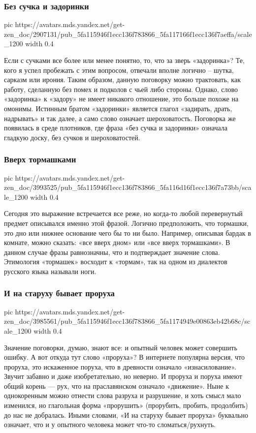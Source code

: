 \subsubsection{Без сучка и задоринки}

\ifcmt
  pic https://avatars.mds.yandex.net/get-zen_doc/2907131/pub_5fa115946f1ecc136f783866_5fa117166f1ecc136f7aeffa/scale_1200
  width 0.4
\fi

Если с сучками все более или менее понятно, то, что за зверь «задоринка»? Те,
кого я успел пробежать с этим вопросом, отвечали вполне логично – шутка,
сарказм или ирония. Таким образом, данную поговорку можно трактовать, как
работу, сделанную без помех и подколов с чьей либо стороны. Однако, слово
«задоринка» к «задору» не имеет никакого отношение, это больше похоже на
омонимы. Истинным братом «задоринки» является глагол «задирать, драть,
надрывать» и так далее, а само слово означает шероховатость. Поговорка же
появилась в среде плотников, где фраза «без сучка и задоринки» означала гладкую
доску, без сучков и шероховатостей.

\subsubsection{Вверх тормашками}

\ifcmt
  pic https://avatars.mds.yandex.net/get-zen_doc/3993525/pub_5fa115946f1ecc136f783866_5fa116d16f1ecc136f7a73bb/scale_1200
  width 0.4
\fi

Сегодня это выражение встречается все реже, но когда-то любой перевернутый
предмет описывался именно этой фразой. Логично предположить, что тормашки, это
дно или нижнее основание чего бы то ни было. Например, описывая бардак в
комнате, можно сказать: «все вверх дном» или «все вверх тормашками». В данном
случае фразы равнозначны, что и подтверждает значение слова. Этимология
«тормашек» восходит к «тормам», так на одном из диалектов русского языка
называли ноги.

\subsubsection{И на старуху бывает проруха}

\ifcmt
  pic https://avatars.mds.yandex.net/get-zen_doc/3985561/pub_5fa115946f1ecc136f783866_5fa1174949e00863eb42b68c/scale_1200
  width 0.4
\fi

Значение поговорки, думаю, знают все: и опытный человек может совершить ошибку.
А вот откуда тут слово «проруха»? В интернете популярна версия, что проруха,
это искаженное поруха, что в древности означало «изнасилование». Звучит забавно
и даже изобретательно, но неверно. И проруха и поруха имеют общий корень — рух,
что на праславянском означало «движение». Ныне к однокоренным можно отнести
слова разруха и разрушение, и хоть смысл мало изменился, но глагольная форма
«прорушить» (прорубить, пробить, продолбить) до нас не добралась. Иными
словами, «И на старуху бывает проруха» буквально означает, что и у опытного
человека может что-то сломаться/рухнуть.

